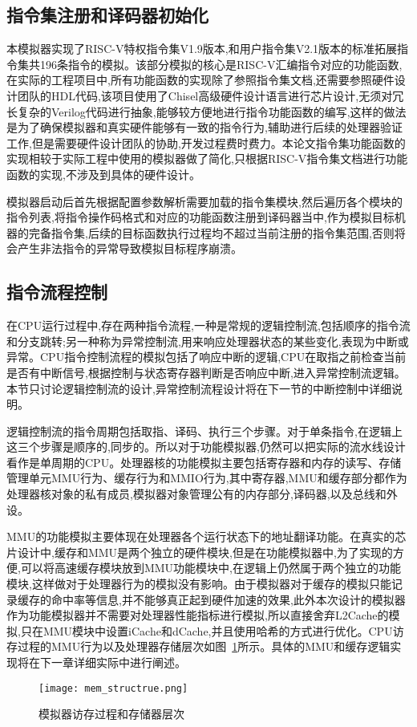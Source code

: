 \subsection{指令集注册和译码器初始化}
本模拟器实现了RISC-V特权指令集V1.9版本,和用户指令集V2.1版本的标准拓展指令集共196条指令的模拟。该部分模拟的核心是RISC-V汇编指令对应的功能函数,在实际的工程项目中,所有功能函数的实现除了参照指令集文档,还需要参照硬件设计团队的HDL代码,该项目使用了Chisel高级硬件设计语言进行芯片设计,无须对冗长复杂的Verilog代码进行抽象,能够较方便地进行指令功能函数的编写,这样的做法是为了确保模拟器和真实硬件能够有一致的指令行为,辅助进行后续的处理器验证工作,但是需要硬件设计团队的协助,开发过程费时费力。本论文指令集功能函数的实现相较于实际工程中使用的模拟器做了简化,只根据RISC-V指令集文档进行功能函数的实现,不涉及到具体的硬件设计。


模拟器启动后首先根据配置参数解析需要加载的指令集模块,然后遍历各个模块的指令列表,将指令操作码格式和对应的功能函数注册到译码器当中,作为模拟目标机器的完备指令集,后续的目标函数执行过程均不超过当前注册的指令集范围,否则将会产生非法指令的异常导致模拟目标程序崩溃。


\subsection{指令流程控制}
在CPU运行过程中,存在两种指令流程,一种是常规的逻辑控制流,包括顺序的指令流和分支跳转;另一种称为异常控制流,用来响应处理器状态的某些变化,表现为中断或异常。CPU指令控制流程的模拟包括了响应中断的逻辑,CPU在取指之前检查当前是否有中断信号,根据控制与状态寄存器判断是否响应中断,进入异常控制流逻辑。本节只讨论逻辑控制流的设计,异常控制流程设计将在下一节的中断控制中详细说明。


逻辑控制流的指令周期包括取指、译码、执行三个步骤。对于单条指令,在逻辑上这三个步骤是顺序的,同步的。所以对于功能模拟器,仍然可以把实际的流水线设计看作是单周期的CPU。处理器核的功能模拟主要包括寄存器和内存的读写、存储管理单元MMU行为、缓存行为和MMIO行为,其中寄存器,MMU和缓存部分都作为处理器核对象的私有成员,模拟器对象管理公有的内存部分,译码器,以及总线和外设。


MMU的功能模拟主要体现在处理器各个运行状态下的地址翻译功能。在真实的芯片设计中,缓存和MMU是两个独立的硬件模块,但是在功能模拟器中,为了实现的方便,可以将高速缓存模块放到MMU功能模块中,在逻辑上仍然属于两个独立的功能模块,这样做对于处理器行为的模拟没有影响。由于模拟器对于缓存的模拟只能记录缓存的命中率等信息,并不能够真正起到硬件加速的效果,此外本次设计的模拟器作为功能模拟器并不需要对处理器性能指标进行模拟,所以直接舍弃L2Cache的模拟,只在MMU模块中设置iCache和dCache,并且使用哈希的方式进行优化。CPU访存过程的MMU行为以及处理器存储层次如图~\ref{fig:mem_structrue}所示。具体的MMU和缓存逻辑实现将在下一章详细实际中进行阐述。
\begin{figure}[H]
  \centering
  \texttt{[image: mem\_structrue.png]}
  \caption{模拟器访存过程和存储器层次}
  \label{fig:mem_structrue}
\end{figure}


